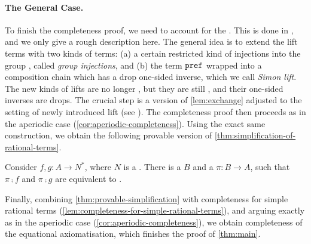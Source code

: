 \paragraph*{The General Case.} To finish the completeness proof, we need to account for the . This is done in , and we only give a rough description here. The general idea is to extend the lift terms with two kinds of terms: (a) a certain restricted kind of injections into the group , called \emph{group injections}, and (b) the term $\mathtt{pref}$ wrapped into a composition chain which has a drop one-sided inverse, which we call \emph{Simon lift}. The new kinds of lifts are no longer , but they are still , and their one-sided inverses are drops. The crucial step is a version of \cref{lem:exchange} adjusted to the setting of newly introduced lift (see ). The completeness proof then proceeds as in the aperiodic case (\cref{cor:aperiodic-completeness}). Using the exact same construction, we obtain the following provable version of \cref{thm:simplification-of-rational-terms}.

\begin{theorem}\label{thm:provable-simplification}
    Consider  $f, g : A \to N^*$, where $N$ is a . There is a  $B$ and a   $\pi : B \to A$, such that $\pi \comp f$ and $\pi \comp g$ are equivalent to .
\end{theorem}

Finally, combining \cref{thm:provable-simplification} with completeness for simple rational terms (\cref{lem:completeness-for-simple-rational-terms}), and arguing exactly as in the aperiodic case (\cref{cor:aperiodic-completeness}), we obtain completeness of the equational axiomatisation, which finishes the proof of \cref{thm:main}.